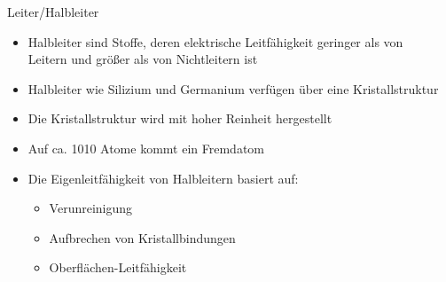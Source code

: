 \documentclass[12pt%
,aspectratio=169%
]{beamer}
\begin{document}
\begin{frame}{Leiter/Halbleiter}
	\begin{itemize}
		\item Halbleiter sind Stoffe, deren elektrische Leitfähigkeit geringer als von\\
		Leitern und größer als von Nichtleitern ist
		\item Halbleiter wie Silizium und Germanium verfügen über eine Kristallstruktur
		\item Die Kristallstruktur wird mit hoher Reinheit hergestellt
		\item Auf ca. 1010 Atome kommt ein Fremdatom
		\item Die Eigenleitfähigkeit von Halbleitern basiert auf:
		\begin{itemize}
			\item Verunreinigung
			\item Aufbrechen von Kristallbindungen
			\item Oberflächen-Leitfähigkeit
		\end{itemize}

	\end{itemize}
\end{frame}
\end{document}
